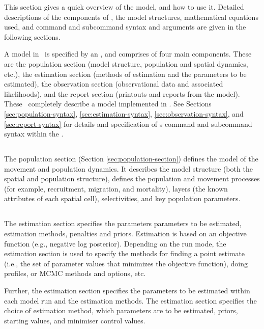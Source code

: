 This section gives a quick overview of the model, and how to use it. Detailed descriptions of the components of \SPM, the model structures, mathematical equations used, and command and subcommand syntax and arguments are given in the following sections.

A model in \SPM\ is specified by an \config, and comprises of four main components. These are the population section (model structure, population and spatial dynamics, etc.), the estimation section (methods of estimation and the parameters to be estimated), the observation section (observational data and associated likelihoods), and the report section (printouts and reports from the model). These \config\ completely describe a model implemented in \SPM. See Sections \ref{sec:population-syntax}, \ref{sec:estimation-syntax}, \ref{sec:observation-syntax}, and \ref{sec:report-syntax} for details and specification of \SPM s command and subcommand syntax within the \config. 

\subsection{}

The population section (Section \ref{sec:population-section}) defines the model of the movement and population dynamics. It describes the model structure (both the spatial and population structure), defines the population and movement processes (for example, recruitment, migration, and mortality), layers (the known attributes of each spatial cell), selectivities, and key population parameters.

\subsection{}

The estimation section specifies the parameters parameters to be estimated, estimation methods, penalties and priors. Estimation is based on an objective function (e.g., negative log posterior). Depending on the run mode, the estimation section is used to specify the methods for finding a point estimate (i.e., the set of parameter values that minimizes the objective function), doing profiles, or MCMC methods and options, etc.

Further, the estimation section specifies the parameters to be estimated within each model run and the estimation methods. The estimation section specifies the choice of estimation method, which parameters are to be estimated, priors, starting values, and minimiser control values.

